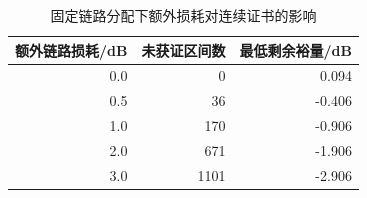 \begin{table}[H]\centering\normalsize
\caption{固定链路分配下额外损耗对连续证书的影响}\label{tab:communication_loss}
\begin{tabular}{rrr}
\toprule
额外链路损耗/dB & 未获证区间数 & 最低剩余裕量/dB\\\midrule
0.0 & 0 & 0.094\\
0.5 & 36 & -0.406\\
1.0 & 170 & -0.906\\
2.0 & 671 & -1.906\\
3.0 & 1101 & -2.906\\
\bottomrule\end{tabular}
\end{table}
